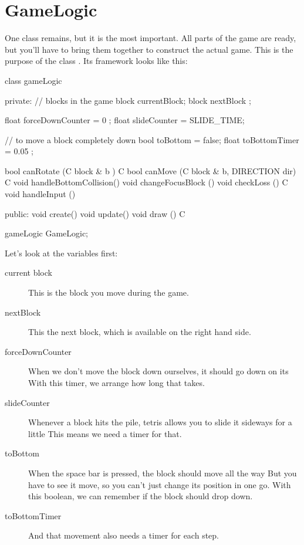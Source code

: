 \chapter{GameLogic}
One class remains, but it is the most important. All parts of the game are ready, but you'll have to bring them together to construct the actual game. This is the purpose of the class . Its framework looks like this:

\begin{code}
class gameLogic
{
private:
   // blocks in the game
   block currentBlock;
   block nextBlock   ;

   float forceDownCounter = 0         ;
   float slideCounter     = SLIDE_TIME;
   
   // to move a block completely down
   bool  toBottom      = false;
   float toBottomTimer = 0.05 ; 
   
   bool canRotate            (C block & b               ) C {}
   bool canMove              (C block & b, DIRECTION dir) C {}
   void handleBottomCollision()   {}   
   void changeFocusBlock     ()   {}    
   void checkLoss            () C {}
   void handleInput          ()   {}
    
public:
   void create()
   void update()   {}
   void draw  () C {}
} 
gameLogic GameLogic;
\end{code}

Let's look at the variables first:

\begin{description}
	\item[current block] This is the block you move during the game.
	\item[nextBlock] This the next block, which is available on the right hand side.
	\item[forceDownCounter] When we don't move the block down ourselves, it should go down on its  With this timer, we arrange how long that takes.
	\item[slideCounter] Whenever a block hits the pile, tetris allows you to slide it sideways for a little  This means we need a timer for that.
	\item[toBottom] When the space bar is pressed, the block should move all the way  But you have to see it move, so you can't just change its position in one go. With this boolean, we can remember if the block should drop down.
	\item[toBottomTimer] And that movement also needs a timer for each step.
\end{description}

